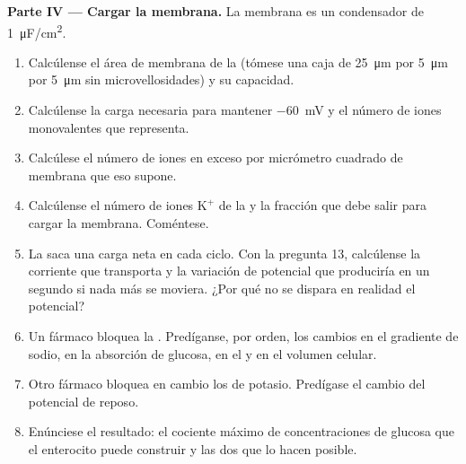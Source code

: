 \begin{problem}
\medskip
\noindent\textbf{Parte IV --- Cargar la membrana.}
La membrana es un condensador de \qty{1}{\micro F/cm^2}.
\begin{enumerate}[resume]
  \item Calcúlense el área de membrana de la  (tómese una caja de
        \qty{25}{\micro m} por \qty{5}{\micro m} por \qty{5}{\micro m} sin
        microvellosidades) y su capacidad.
  \item Calcúlense la carga necesaria para mantener \qty{-60}{mV} y el
        número de iones monovalentes que representa.
  \item Calcúlese el número de iones en exceso por micrómetro cuadrado de
        membrana que eso supone.
  \item Calcúlense el número de iones $\mathrm{K^+}$ de la  y la
        fracción que debe salir para cargar la membrana. Coméntese.
  \item La  saca una carga neta en cada ciclo. Con la pregunta 13,
        calcúlense la corriente que transporta y la variación de potencial
        que produciría en un segundo si nada más se moviera. ¿Por qué no se
        dispara en realidad el potencial?
  \item Un fármaco bloquea la . Predíganse, por orden, los cambios en
        el gradiente de sodio, en la absorción de glucosa, en el  y en el volumen celular.
  \item Otro fármaco bloquea en cambio los  de potasio. Predígase el
        cambio del potencial de reposo.
  \item Enúnciese el resultado: el cociente máximo de concentraciones de
        glucosa que el enterocito puede construir y las dos  que lo hacen posible.
\end{enumerate}
\end{problem}
